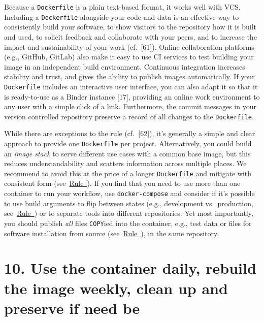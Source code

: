 \documentclass[10pt,letterpaper]{article}
\begin{document}
Because a \texttt{Dockerfile} is a plain text-based format, it works
well with VCS. Including a \texttt{Dockerfile} alongside your code and
data is an effective way to consistently build your software, to show
visitors to the repository how it is built and used, to solicit feedback
and collaborate with your peers, and to increase the impact and
sustainability of your work (cf.~{[}61{]}). Online collaboration
platforms (e.g., GitHub, GitLab) also make it easy to use CI services to
test building your image in an independent build environment. Continuous
integration increases stability and trust, and gives the ability to
publish images automatically. If your \texttt{Dockerfile} includes an
interactive user interface, you can also adapt it so that it is
ready-to-use as a Binder instance {[}17{]}, providing an online work
environment to any user with a simple click of a link. Furthermore, the
commit messages in your version controlled repository preserve a record
of all changes to the \texttt{Dockerfile}.

While there are exceptions to the rule (cf.~{[}62{]}), it's generally a
simple and clear approach to provide one \texttt{Dockerfile} per
project. Alternatively, you could build an \emph{image stack} to serve
different use cases with a common base image, but this reduces
understandability and scatters information across multiple places. We
recommend to avoid this at the price of a longer \texttt{Dockerfile} and
mitigate with consistent form
(see~\hyperref[{rule:formatting}]{Rule~}). If
you find that you need to use more than one container to run your
workflow, use \texttt{docker-compose} and consider if it's possible to
use build arguments to flip between states (e.g., development
vs.~production,
see~\hyperref[{rule:interactive}]{Rule~}) or
to separate tools into different repositories. Yet most importantly, you
should publish \emph{all} files \texttt{COPY}ied into the container,
e.g., test data or files for software installation from source
(see~\hyperref[{rule:mount}]{Rule~}), in the same
repository.

\hypertarget{use-the-container-daily-rebuild-the-image-weekly-clean-up-and-preserve-if-need-be}{%
\section*{10. Use the container daily, rebuild the image weekly, clean
up and preserve if need
be}\label{use-the-container-daily-rebuild-the-image-weekly-clean-up-and-preserve-if-need-be}}
\end{document}
